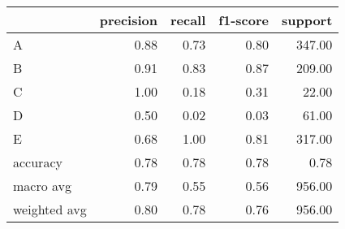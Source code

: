 \begin{tabular}{|l|r|r|r|r|}
\hline
{} &  precision &  recall &  f1-score &  support \\
\hline
A            &       0.88 &    0.73 &      0.80 &   347.00 \\
B            &       0.91 &    0.83 &      0.87 &   209.00 \\
C            &       1.00 &    0.18 &      0.31 &    22.00 \\
D            &       0.50 &    0.02 &      0.03 &    61.00 \\
E            &       0.68 &    1.00 &      0.81 &   317.00 \\
accuracy     &       0.78 &    0.78 &      0.78 &     0.78 \\
macro avg    &       0.79 &    0.55 &      0.56 &   956.00 \\
weighted avg &       0.80 &    0.78 &      0.76 &   956.00 \\
\hline
\end{tabular}
